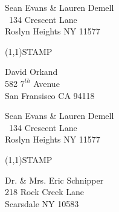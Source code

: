 \documentclass[12pt]{article}
\begin{document}
\begin{minipage}{.5\linewidth} \noindent
Sean Evans \& Lauren Demell\\\ 
134 Crescent Lane\\ 
Roslyn Heights NY 11577
\end{minipage}
\begin{minipage}{.5\linewidth \hspace{-.2in} \vspace{-.3in}}
\begin{flushright}
\framebox(1,1){STAMP}
\end{flushright}
\end{minipage}

\begin{center} \begin{Huge} \vspace*{\fill}
David Orkand\\
582 $7^{th}$ Avenue\\
San Fransisco CA 94118\\
\vspace{\fill} \end{Huge} \end{center}

\clearpage

\begin{minipage}{.5\linewidth} \noindent
Sean Evans \& Lauren Demell\\\ 
134 Crescent Lane\\ 
Roslyn Heights NY 11577
\end{minipage}
\begin{minipage}{.5\linewidth \hspace{-.2in} \vspace{-.3in}}
\begin{flushright}
\framebox(1,1){STAMP}
\end{flushright}
\end{minipage}

\begin{center} \begin{Huge} \vspace*{\fill}
Dr. \& Mrs. Eric Schnipper\\
218 Rock Creek Lane\\
Scarsdale NY 10583\\
\vspace{\fill} \end{Huge} \end{center}

\clearpage
\end{document}
